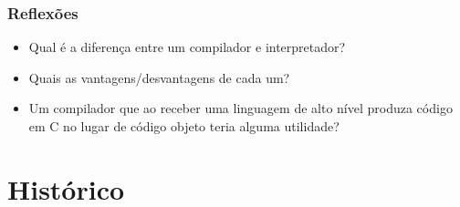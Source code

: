 \documentclass[table]{beamer}
\begin{document}
\begin{frame}
   \frametitle{Reflexões}
   \begin{itemize}
      \item Qual é a diferença entre um compilador e interpretador?
      \item Quais as vantagens/desvantagens de cada um?
      \item Um compilador que ao receber uma linguagem de alto nível produza código em C no lugar de código objeto teria alguma utilidade?
   \end{itemize}
\end{frame}

\section{Histórico}
\end{document}
